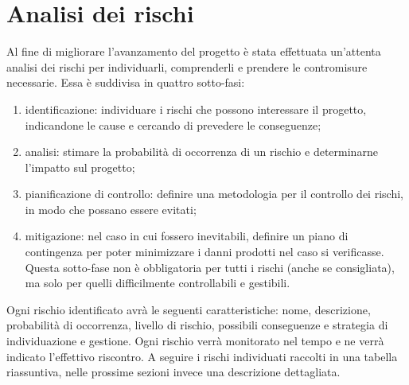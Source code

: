 \documentclass[../PianoProgetto.tex]{subfiles}
\begin{document}
\section{Analisi dei rischi}

	Al fine di migliorare l'avanzamento del progetto è stata effettuata un'attenta analisi dei rischi per individuarli, comprenderli e prendere le contromisure necessarie. Essa è suddivisa in quattro sotto-fasi:
	\begin{enumerate}
	\item identificazione: individuare i rischi che possono interessare il progetto, indicandone le cause e cercando di prevedere le conseguenze;
	\item analisi: stimare la probabilità di occorrenza di un rischio e determinarne l'impatto sul progetto;
	\item pianificazione di controllo: definire una metodologia per il controllo dei rischi, in modo che possano essere evitati;
	\item mitigazione: nel caso in cui fossero inevitabili, definire un piano di contingenza per poter minimizzare i danni prodotti nel caso si verificasse. Questa sotto-fase non è obbligatoria per tutti i rischi (anche se consigliata), ma solo per quelli difficilmente controllabili e gestibili.
	\end{enumerate}
	Ogni rischio identificato avrà le seguenti caratteristiche: nome, descrizione, probabilità di occorrenza, livello di rischio, possibili conseguenze e strategia di individuazione e gestione. Ogni rischio verrà monitorato nel tempo e ne verrà indicato l'effettivo riscontro. A seguire i rischi individuati raccolti in una tabella riassuntiva, nelle prossime sezioni invece una descrizione dettagliata.	
		
	\newpage
	
\end{document}
